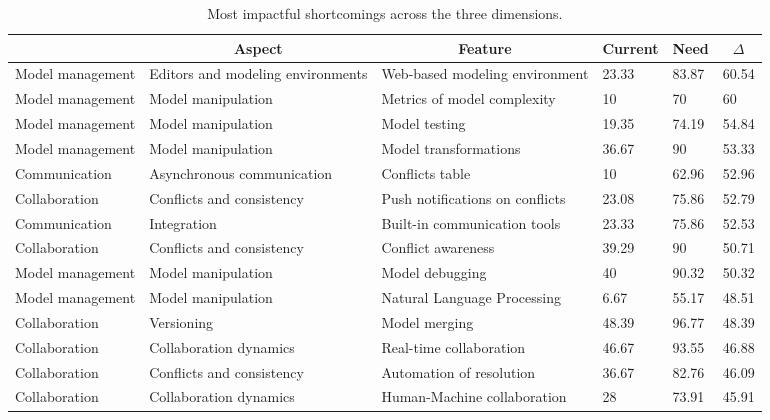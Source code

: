 
  \begin{table*}[]
  \centering
  \notsotiny
  \caption{ Most impactful shortcomings across the three dimensions.}
\label{tab:most-impactful}
\begin{tabular}{|l|l|l|l|l|l|}
  \hline
  \rowcolor[HTML]{C0C0C0}
    \multicolumn{1}{|c|}{Dimension} & \multicolumn{1}{c|}{Aspect} & \multicolumn{1}{c|}{Feature} & \multicolumn{1}{c|}{Current} & \multicolumn{1}{c|}{Need} & \multicolumn{1}{c|}{$\Delta$} \\ \hline
    Model management & Editors and modeling environments & Web-based modeling environment & 23.33 & 83.87 & 60.54 \\ \hline 
Model management & Model manipulation & Metrics of model complexity & 10 & 70 & 60 \\ \hline 
Model management & Model manipulation & Model testing & 19.35 & 74.19 & 54.84 \\ \hline 
Model management & Model manipulation & Model transformations & 36.67 & 90 & 53.33 \\ \hline 
Communication & Asynchronous communication & Conflicts table & 10 & 62.96 & 52.96 \\ \hline 
Collaboration & Conflicts and consistency & Push notifications on conflicts & 23.08 & 75.86 & 52.79 \\ \hline 
Communication & Integration & Built-in communication tools & 23.33 & 75.86 & 52.53 \\ \hline 
Collaboration & Conflicts and consistency & Conflict awareness & 39.29 & 90 & 50.71 \\ \hline 
Model management & Model manipulation & Model debugging & 40 & 90.32 & 50.32 \\ \hline 
Model management & Model manipulation & Natural Language Processing & 6.67 & 55.17 & 48.51 \\ \hline 
Collaboration & Versioning & Model merging & 48.39 & 96.77 & 48.39 \\ \hline 
Collaboration & Collaboration dynamics & Real-time collaboration & 46.67 & 93.55 & 46.88 \\ \hline 
Collaboration & Conflicts and consistency & Automation of resolution & 36.67 & 82.76 & 46.09 \\ \hline 
Collaboration & Collaboration dynamics & Human-Machine collaboration & 28 & 73.91 & 45.91 \\ \hline 

\end{tabular}
\end{table*}
